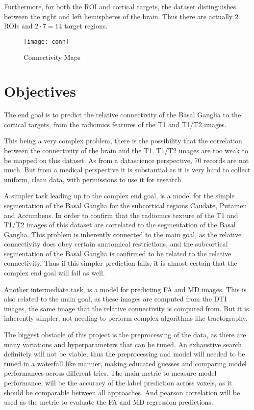Furthermore, for both the \ac{ROI} and cortical targets, the dataset distinguishes between the right and left hemispheres of the brain. Thus there are actually 2 \ac{ROI}s and $2 \cdot 7=14$ target regions.

\begin{figure}[H]
\centering
\texttt{[image: conn]}
\caption{Connectivity Maps}
\label{fig:conn}
\end{figure}

\section{Objectives}

The end goal is to predict the relative connectivity of the Basal Ganglia to the cortical targets, from the radiomics features of the T1 and T1/T2 images.\par

This being a very complex problem, there is the possibility that the correlation between the connectivity of the brain and the T1, T1/T2 images are too weak to be mapped on this dataset. As from a datascience perspective, 70 records are not much. But from a medical perspective it is substantial as it is very hard to collect uniform, clean data, with permissions to use it for research.\par

A simpler task leading up to the complex end goal, is a model for the simple segmentation of the Basal Ganglia for the subcortical regions Caudate, Putamen and Accumbens. In order to confirm that the radiomics texture of the T1 and T1/T2 images of this dataset are correlated to the segmentation of the Basal Ganglia. This problem is inherently connected to the main goal, as the relative connectivity does obey certain anatomical restrictions, and the subcortical segmentation of the Basal Ganglia is confirmed to be related to the relative connectivity. Thus if this simpler prediction fails, it is almost certain that the complex end goal will fail as well.\par

Another intermediate task, is a model for predicting \ac{FA} and \ac{MD} images. This is also related to the main goal, as these images are computed from the \ac{DTI} images, the same image that the relative connectivity is computed from. But it is inherently simpler, not needing to perform complex algorithms like tractography.\par

The biggest obstacle of this project is the preprocessing of the data, as there are many variations and hyperparameters that can be tuned. An exhaustive search definitely will not be viable, thus the preprocessing and model will needed to be tuned in a waterfall like manner, making educated guesses and comparing model performances across different tries. The main metric to measure model performance, will be the accuracy of the label prediction across voxels, as it should be comparable between all approaches. And pearson correlation will be used as the metric to evaluate the \ac{FA} and \ac{MD} regression predictions.

